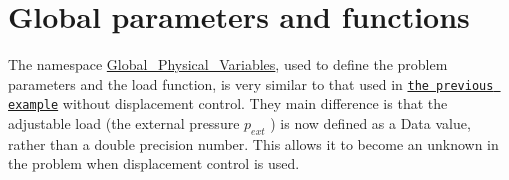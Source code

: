  

\hypertarget{index_namespace}{}\section{Global parameters and functions}\label{index_namespace}
The namespace {\ttfamily \hyperlink{namespaceGlobal__Physical__Variables}{Global\+\_\+\+Physical\+\_\+\+Variables}}, used to define the problem parameters and the load function, is very similar to that used in \href{../../tensioned_string/html/index.html}{\tt the previous example} without displacement control. They main difference is that the adjustable load (the external pressure $ p_{ext}$ ) is now defined as a {\ttfamily Data} value, rather than a double precision number. This allows it to become an unknown in the problem when displacement control is used.


